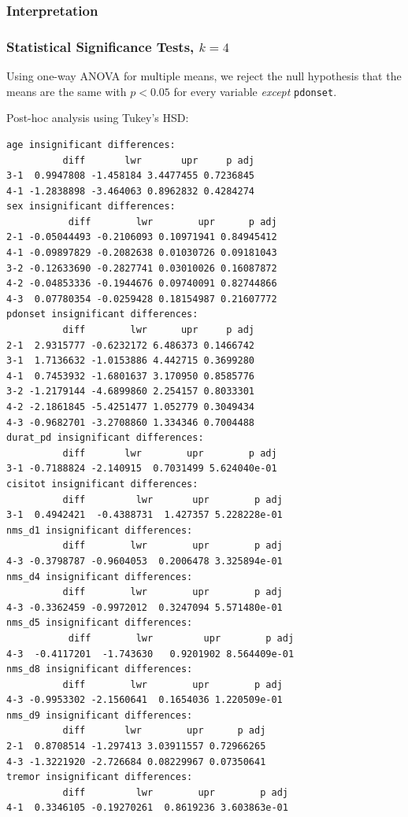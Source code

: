 \documentclass[letterpaper,12pt]{article}
\begin{document}
\subsubsection{Interpretation}

\subsubsection{Statistical Significance Tests, $k = 4$}
Using one-way ANOVA for multiple means, we reject the null
hypothesis that the means are the same with $p < 0.05$ for every variable
\emph{except} \texttt{pdonset}.

Post-hoc analysis using Tukey's HSD:
\begin{verbatim}
age insignificant differences:
          diff       lwr       upr     p adj
3-1  0.9947808 -1.458184 3.4477455 0.7236845
4-1 -1.2838898 -3.464063 0.8962832 0.4284274
sex insignificant differences:
           diff        lwr        upr      p adj
2-1 -0.05044493 -0.2106093 0.10971941 0.84945412
4-1 -0.09897829 -0.2082638 0.01030726 0.09181043
3-2 -0.12633690 -0.2827741 0.03010026 0.16087872
4-2 -0.04853336 -0.1944676 0.09740091 0.82744866
4-3  0.07780354 -0.0259428 0.18154987 0.21607772
pdonset insignificant differences:
          diff        lwr      upr     p adj
2-1  2.9315777 -0.6232172 6.486373 0.1466742
3-1  1.7136632 -1.0153886 4.442715 0.3699280
4-1  0.7453932 -1.6801637 3.170950 0.8585776
3-2 -1.2179144 -4.6899860 2.254157 0.8033301
4-2 -2.1861845 -5.4251477 1.052779 0.3049434
4-3 -0.9682701 -3.2708860 1.334346 0.7004488
durat_pd insignificant differences:
          diff       lwr        upr        p adj
3-1 -0.7188824 -2.140915  0.7031499 5.624040e-01
cisitot insignificant differences:
          diff         lwr       upr        p adj
3-1  0.4942421  -0.4388731  1.427357 5.228228e-01
nms_d1 insignificant differences:
          diff        lwr        upr        p adj
4-3 -0.3798787 -0.9604053  0.2006478 3.325894e-01
nms_d4 insignificant differences:
          diff        lwr        upr        p adj
4-3 -0.3362459 -0.9972012  0.3247094 5.571480e-01
nms_d5 insignificant differences:
           diff        lwr         upr        p adj
4-3  -0.4117201  -1.743630   0.9201902 8.564409e-01
nms_d8 insignificant differences:
          diff        lwr        upr        p adj
4-3 -0.9953302 -2.1560641  0.1654036 1.220509e-01
nms_d9 insignificant differences:
          diff       lwr        upr      p adj
2-1  0.8708514 -1.297413 3.03911557 0.72966265
4-3 -1.3221920 -2.726684 0.08229967 0.07350641
tremor insignificant differences:
          diff         lwr        upr        p adj
4-1  0.3346105 -0.19270261  0.8619236 3.603863e-01
\end{verbatim}
\end{document}
